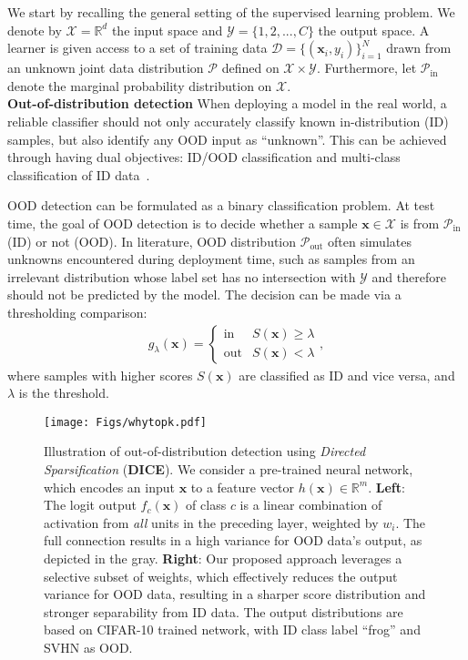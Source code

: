 \documentclass[runningheads]{llncs}
\def\*#1{\mathbf{#1}}
\begin{document}
We start by recalling the general setting of the supervised learning problem. We denote by $\mathcal{X}=\mathbb{R}^d$  the input space and $\mathcal{Y}=\{1,2,...,C\}$  the output space. A learner is given access to a set of training data $\mathcal{D}=\{(\*x_i,y_i)\}_{i=1}^N$ drawn from an unknown joint data distribution $\mathcal{P}$ defined on $\mathcal{X}\times \mathcal{Y}$. Furthermore, let $\mathcal{P}_\text{in}$ denote the marginal probability distribution on $\mathcal{X}$. \\


\noindent \textbf{Out-of-distribution detection} When deploying a model in the real world, a reliable classifier should not only accurately classify known in-distribution (ID) samples, but also identify any OOD input as ``unknown''. This can be achieved through having dual objectives: ID/OOD classification and multi-class classification of ID data~\cite{bendale2016towards}. 

OOD detection can be formulated as a binary classification problem.  At test time, the goal of OOD detection is to decide whether a sample $\*x \in \mathcal{X}$ is from $\mathcal{P}_\text{in}$ (ID) or not (OOD). In literature, OOD distribution $\mathcal{P}_\text{out}$ often simulates unknowns encountered during deployment time, such as samples from an irrelevant distribution {whose label set has no intersection with $\mathcal{Y}$ and therefore should not be predicted by the model}. The decision can be made via a thresholding comparison: \begin{align*}
\label{eq:threshold}
	g_{\lambda}(\*x)=\begin{cases} 
      \text{in} & S(\*x)\ge \lambda \\
      \text{out} & S(\*x) < \lambda 
  \end{cases},
\end{align*}
where samples with higher scores $S(\*x)$ are classified as ID and vice versa, and  $\lambda$ is the threshold. 




\begin{figure*}[tb]
	\begin{center}
		\texttt{[image: Figs/whytopk.pdf]}
	\end{center}
	\caption{\small Illustration of out-of-distribution detection using \emph{Directed Sparsification} (\textbf{DICE}). We consider a pre-trained neural network, which encodes an input $\*x$ to a feature vector $h(\*x) \in \mathbb{R}^m$. \textbf{Left}: The logit output $f_c(\*x)$ of class $c$ is a linear combination of activation from \emph{all} units in the preceding layer, weighted by $w_i$. The full connection results in a high variance for OOD data's output, as depicted in the gray. \textbf{Right}: Our proposed approach leverages a selective subset of weights, which effectively reduces the output variance for OOD data, resulting in a sharper score distribution and stronger separability from ID data. The output distributions are based on CIFAR-10 trained network, with ID class label ``frog'' and SVHN as OOD.}
	\label{fig:teaser}
\end{figure*}
\end{document}
